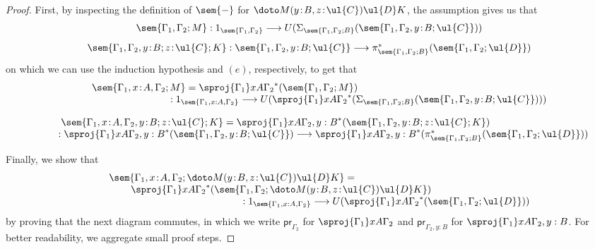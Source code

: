 \begin{proof}
First, by inspecting the definition of $\sem{-}$ for $\doto M {(y \!:\! B, z \!:\! \ul{C})} {\ul{D}} K$, the assumption gives us that
\[
\begin{array}{c}
\sem{\Gamma_1,\Gamma_2; M} : 1_{\sem{\Gamma_1,\Gamma_2}} \longrightarrow U(\Sigma_{\sem{\Gamma_1,\Gamma_2;B}}(\sem{\Gamma_1,\Gamma_2,y \!:\! B;\ul{C}}))
\\[3mm]
\sem{\Gamma_1,\Gamma_2, y \!:\! B; z \!:\! \ul{C}; K} : \sem{\Gamma_1,\Gamma_2,y \!:\! B;\ul{C}} \longrightarrow \pi^*_{\sem{\Gamma_1,\Gamma_2;B}}(\sem{\Gamma_1,\Gamma_2; \ul{D}})
\end{array}
\]
on which we can use the induction hypothesis and $(e)$, respectively, to get that
\[
\begin{array}{c}
\hspace{-6cm}
\sem{\Gamma_1, x \!:\! A,\Gamma_2;M} = \sproj {\Gamma_1} x A {\Gamma_2}^*(\sem{\Gamma_1,\Gamma_2;M}) 
\\
\hspace{3.5cm}
: 1_{\sem{\Gamma_1, x : A,\Gamma_2}} \longrightarrow U(\sproj {\Gamma_1} x A {\Gamma_2}^*(\Sigma_{\sem{\Gamma_1,\Gamma_2;B}}(\sem{\Gamma_1,\Gamma_2,y \!:\! B;\ul{C}})))
\\[4mm]
\hspace{-2.4cm}
\sem{\Gamma_1, x \!:\! A,\Gamma_2, y \!:\! B; z \!:\! \ul{C};K} = \sproj {\Gamma_1} x A {\Gamma_2, y : B}^*(\sem{\Gamma_1,\Gamma_2, y \!:\! B; z \!:\! \ul{C};K})
\\
\hspace{1cm}
: \sproj {\Gamma_1} x A {\Gamma_2, y : B}^*(\sem{\Gamma_1,\Gamma_2,y \!:\! B;\ul{C}}) \longrightarrow \sproj {\Gamma_1} x A {\Gamma_2, y : B}^*(\pi^*_{\sem{\Gamma_1,\Gamma_2;B}}(\sem{\Gamma_1,\Gamma_2; \ul{D}}))
\end{array}
\vspace{0.25cm}
\]

Finally, we show that 
\[
\begin{array}{c}
\hspace{-5.5cm}
\sem{\Gamma_1, x \!:\! A,\Gamma_2; \doto M {(y \!:\! B, z \!:\! \ul{C})} {\ul{D}} K} = 
\\
\hspace{-2cm}
\sproj {\Gamma_1} x A {\Gamma_2}^*(\sem{\Gamma_1,\Gamma_2; \doto M {(y \!:\! B, z \!:\! \ul{C})} {\ul{D}} K}) 
\\
\hspace{5.5cm}
: 1_{\sem{\Gamma_1, x : A,\Gamma_2}} \longrightarrow U(\sproj {\Gamma_1} x A {\Gamma_2}^*(\sem{\Gamma_1,\Gamma_2; \ul{D}}))
\end{array}
\]
by proving that the next diagram commutes, in which we write $\mathsf{pr}_{\Gamma_2}$ for $\sproj {\Gamma_1} x A {\Gamma_2}$ and $\mathsf{pr}_{\Gamma_2, y : B}$ for $\sproj {\Gamma_1} x A {\Gamma_2, y : B}$. For better readability, we aggregate small proof steps.


\end{proof}
